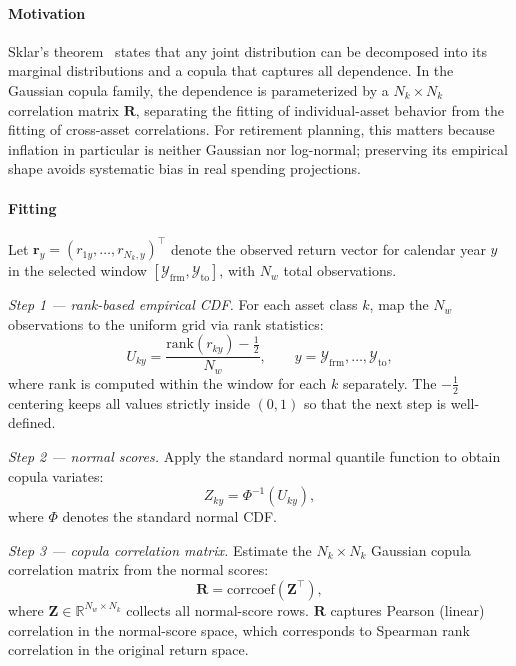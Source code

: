 \documentclass[fleqn,12pt]{report}
\begin{document}
\paragraph*{Motivation}
Sklar's theorem~\cite{sklar1959} states that any joint distribution can be
decomposed into its marginal distributions and a copula that captures all
dependence.
In the Gaussian copula family, the dependence is parameterized by a
$N_k \times N_k$ correlation matrix $\bm{R}$, separating the fitting of
individual-asset behavior from the fitting of cross-asset correlations.
For retirement planning, this matters because inflation in particular
is neither Gaussian nor log-normal; preserving its empirical shape avoids
systematic bias in real spending projections.

\paragraph*{Fitting}
Let $\bm{r}_y = (r_{1y}, \ldots, r_{N_k,y})^\top$ denote the observed
return vector for calendar year $y$ in the selected window
$[\mathcal{Y}_{\mathrm{frm}}, \mathcal{Y}_{\mathrm{to}}]$,
with $N_w$ total observations.

\textit{Step 1 --- rank-based empirical CDF.}
For each asset class $k$, map the $N_w$ observations to the
uniform grid via rank statistics:
\begin{equation}
    U_{ky} = \frac{\mathrm{rank}(r_{ky}) - \tfrac{1}{2}}{N_w},
    \qquad y = \mathcal{Y}_{\mathrm{frm}},\ldots,\mathcal{Y}_{\mathrm{to}},
    \label{Eq:CopulaUniform}
\end{equation}
where rank is computed within the window for each $k$ separately.
The $-\tfrac{1}{2}$ centering keeps all values strictly inside $(0,1)$
so that the next step is well-defined.

\textit{Step 2 --- normal scores.}
Apply the standard normal quantile function to obtain copula variates:
\begin{equation}
    Z_{ky} = \Phi^{-1}(U_{ky}),
    \label{Eq:CopulaNormalScores}
\end{equation}
where $\Phi$ denotes the standard normal CDF.

\textit{Step 3 --- copula correlation matrix.}
Estimate the $N_k \times N_k$ Gaussian copula correlation matrix
from the normal scores:
\begin{equation}
    \bm{R} = \mathrm{corrcoef}\!\left(\bm{Z}^\top\right),
    \label{Eq:CopulaR}
\end{equation}
where $\bm{Z} \in \mathbb{R}^{N_w \times N_k}$ collects all normal-score
rows.
$\bm{R}$ captures Pearson (linear) correlation in the normal-score space,
which corresponds to Spearman rank correlation in the original return space.
\end{document}
